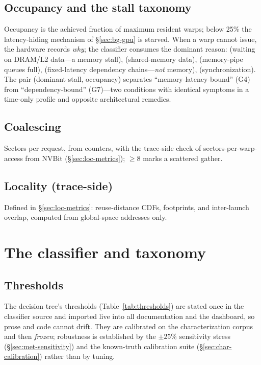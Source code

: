 \subsection{Occupancy and the stall taxonomy}
Occupancy is the achieved fraction of maximum resident warps; below 25\%
the latency-hiding mechanism of \S\ref{sec:bg-gpu} is starved. When a warp
cannot issue, the hardware records \emph{why}; the classifier consumes the
dominant reason:  (waiting on DRAM/L2 data---a memory
stall),  (shared-memory data),  (memory-pipe queues full),  (fixed-latency dependency
chains---\emph{not} memory),  (synchronization). The pair
(dominant stall, occupancy) separates ``memory-latency-bound'' (G4) from
``dependency-bound'' (G7)---two conditions with identical symptoms in a
time-only profile and opposite architectural remedies.

\subsection{Coalescing}
Sectors per request, from counters, with the trace-side check of
sectors-per-warp-access from NVBit (\S\ref{sec:loc-metrics});
$\geq 8$ marks a scattered gather.

\subsection{Locality (trace-side)}
Defined in \S\ref{sec:loc-metrics}: reuse-distance CDFs, footprints, and
inter-launch overlap, computed from global-space addresses only.

\section{The classifier and taxonomy}
\label{sec:met-tree}

\subsection{Thresholds}
The decision tree's thresholds (Table~\ref{tab:thresholds}) are stated once
in the classifier source and imported live into all documentation and the
dashboard, so prose and code cannot drift. They are calibrated on the
characterization corpus and then \emph{frozen}; robustness is established by
the $\pm 25\%$ sensitivity stress (\S\ref{sec:met-sensitivity}) and the
known-truth calibration suite (\S\ref{sec:char-calibration}) rather than by
tuning.

